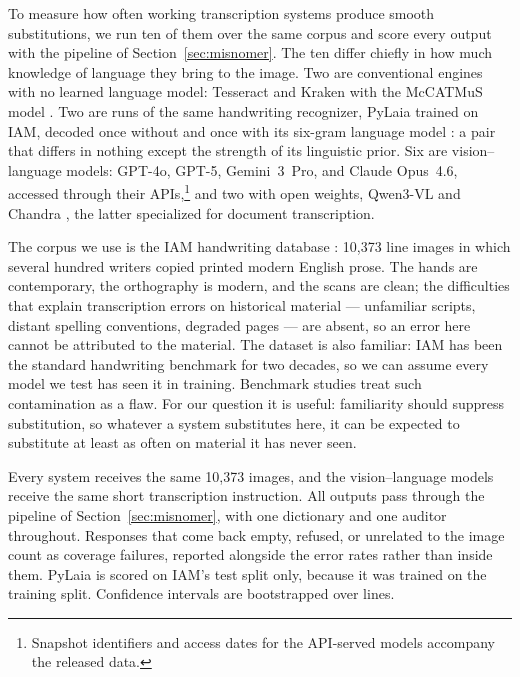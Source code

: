 \documentclass{anthology-ch}         %
\begin{document}
To measure how often working transcription systems produce smooth substitutions, we run ten of them over the same corpus and score every output with the pipeline of Section~\ref{sec:misnomer}. The ten differ chiefly in how much knowledge of language they bring to the image. Two are conventional engines with no learned language model: Tesseract \cite{smith_overview_2007} and Kraken \cite{kiessling_kraken_2019} with the McCATMuS model \cite{chague_mccatmus_2024}. Two are runs of the same handwriting recognizer, PyLaia \cite{puigcerver_are_2017} trained on IAM, decoded once without and once with its six-gram language model \cite{tarride_improving_2024}: a pair that differs in nothing except the strength of its linguistic prior. Six are vision--language models: GPT-4o, GPT-5, Gemini~3~Pro, and Claude Opus~4.6, accessed through their APIs,\footnote{Snapshot identifiers and access dates for the API-served models accompany the released data.} and two with open weights, Qwen3-VL \cite{qwen_team_qwen3-vl-8b-instruct_2025} and Chandra \cite{datalab_chandra_2025}, the latter specialized for document transcription.

The corpus we use is the IAM handwriting database \cite{marti_iam-database_2002}: 10,373 line images in which several hundred writers copied printed modern English prose. The hands are contemporary, the orthography is modern, and the scans are clean; the difficulties that explain transcription errors on historical material --- unfamiliar scripts, distant spelling conventions, degraded pages --- are absent, so an error here cannot be attributed to the material. The dataset is also familiar: IAM has been the standard handwriting benchmark for two decades, so we can assume every model we test has seen it in training. Benchmark studies treat such contamination as a flaw. For our question it is useful: familiarity should suppress substitution, so whatever a system substitutes here, it can be expected to substitute at least as often on material it has never seen.

Every system receives the same 10,373 images, and the vision--language models receive the same short transcription instruction. All outputs pass through the pipeline of Section~\ref{sec:misnomer}, with one dictionary and one auditor throughout. Responses that come back empty, refused, or unrelated to the image count as coverage failures, reported alongside the error rates rather than inside them. PyLaia is scored on IAM's test split only, because it was trained on the training split. Confidence intervals are bootstrapped over lines.
\end{document}
